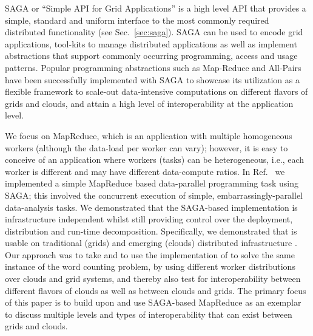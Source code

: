 \documentclass[3p,twocolumn]{elsarticle}
\begin{document}




SAGA or “Simple API for Grid Applications” is a high level API that
provides a simple, standard and uniform interface to the most commonly
required distributed functionality (see Sec.~\ref{sec:saga}). SAGA can
be used to encode grid applications, tool-kits to manage distributed
applications as well as implement abstractions that support commonly
occurring programming, access and usage patterns. Popular programming
abstractions such as Map-Reduce and All-Pairs \cite{allpairs} have been successfully
implemented with SAGA to showcase its utilization as a flexible
framework to scale-out data-intensive computations on different flavors
of grids and clouds, and attain a high level of interoperability at the
application level. 
 
We focus on MapReduce, which is an application with multiple homogeneous
workers (although the data-load per worker can vary); however, it is
easy to conceive of an application where workers (tasks) can be
heterogeneous, i.e., each worker is different and may have different
data-compute ratios.  In Ref.~\cite{saga_ccgrid09} we implemented
a simple MapReduce based data-parallel programming task using SAGA; this
involved the concurrent execution of simple, embarrassingly-parallel
data-analysis tasks.  We demonstrated that the SAGA-based implementation
is infrastructure independent whilst still providing control over the
deployment, distribution and run-time decomposition.  Specifically, we
demonstrated that \sagamapreduce is usable on traditional (grids) and
emerging (clouds) distributed infrastructure .  Our
approach was to take \sagamapreduce and to use the 
implementation of \sagamapreduce to solve the same instance of the word
counting problem, by using different worker distributions over clouds
and grid systems, and thereby also test for interoperability between
different flavors of clouds as well as between clouds and grids.  The
primary focus of this paper is to build upon and use SAGA-based
MapReduce as an exemplar to discuss multiple levels and types of
interoperability that can exist between grids and clouds. 
\end{document}
